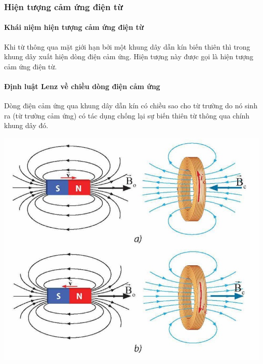 \begin{tomtat}
	\subsubsection{Hiện tượng cảm ứng điện từ}
	\paragraph{Khái niệm hiện tượng cảm ứng điện từ}
	\begin{dn}
		Khi từ thông qua mặt giới hạn bởi một khung dây dẫn kín biến thiên thì trong khung dây xuất hiện dòng điện cảm ứng. Hiện tượng này được gọi là hiện tượng cảm ứng điện từ.
	\end{dn}
	\paragraph{Định luật Lenz về chiều dòng điện cảm ứng}
	\begin{dl}
		Dòng điện cảm ứng qua khung dây dẫn kín có chiều sao cho từ trường do nó sinh ra (từ trường cảm ứng) có tác dụng chống lại sự biến thiên từ thông qua chính khung dây đó.
	\end{dl}
	\begin{center}
		\includegraphics[width=0.45\linewidth]{figs/VN12-Y24-PH-SYL-020-1}
	\end{center}

\end{tomtat}
